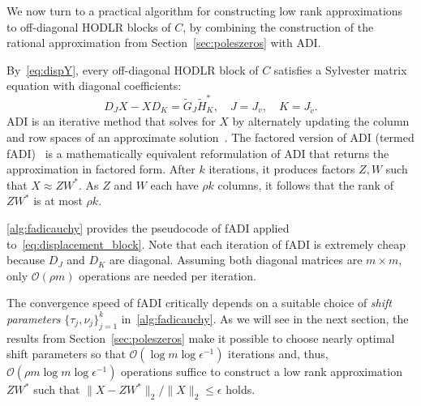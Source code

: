 \documentclass[final,reqno,onefignum,onetabnum]{siamart190516}
\begin{document}
We now turn to a practical algorithm for constructing low rank approximations to off-diagonal HODLR blocks of $C$, by combining the construction of the rational approximation from Section~\ref{sec:poleszeros} with ADI.

By~\eqref{eq:dispY}, every off-diagonal HODLR block  of $C$ satisfies a Sylvester matrix equation with diagonal coefficients:
\begin{equation} 
\label{eq:displacement_block}
D_JX - XD_K = \widetilde{G}_J\widetilde{H}_K^*, \quad J = J_v, \quad K = J_{\widetilde v}.
\end{equation} 
ADI is an iterative method that solves for $X$ by alternately updating the column and row spaces of an approximate solution~\cite{lu1991solution, peaceman1955numerical}.
The factored version of ADI (termed fADI)~\cite{benner2009adi,li2002low} is a mathematically equivalent reformulation of ADI that returns the approximation in factored form. After $k$ iterations, it produces factors $Z,W$ such that $X \approx ZW^*$. As $Z$ and $W$ each have $\rho k$ columns, it follows that the rank of $ZW^*$ is at most $\rho k$. 
 
\cref{alg:fadicauchy} provides the pseudocode of fADI applied to~\eqref{eq:displacement_block}. Note that each 
iteration of fADI is extremely cheap because $D_J$ and $D_K$ are diagonal. Assuming both diagonal matrices are $m\times m$, only $\mathcal{O}(\rho m)$ operations are needed per iteration.

The convergence speed of fADI critically depends on a suitable choice of \textit{shift parameters} $\{\tau_{j}, \nu_{j}\}_{j = 1}^k$ in~\cref{alg:fadicauchy}. As we will see in the next section, the results from Section~\ref{sec:poleszeros} make it possible to choose nearly optimal shift parameters so that 
$\mathcal{O}( \log m \log \epsilon^{-1} )$ iterations and, thus, $\mathcal{O}( \rho m \log m \log \epsilon^{-1} )$ operations suffice to construct a low rank approximation $ZW^*$ such that \hbox{$\|X - ZW^*\|_2/\|X\|_2 \leq \epsilon$} holds.
\end{document}
